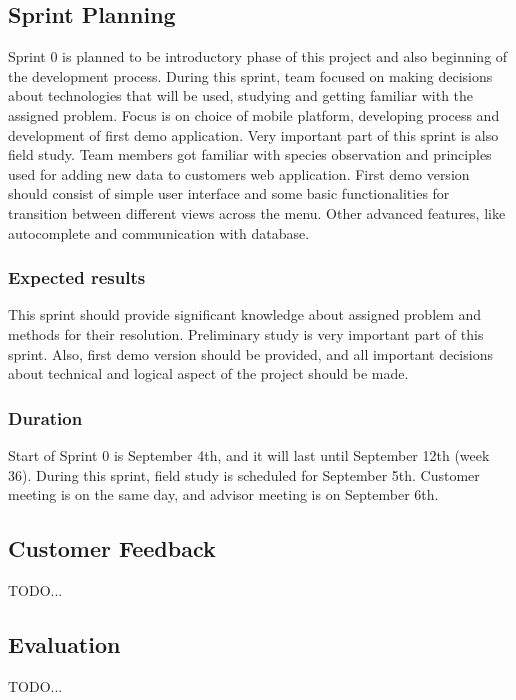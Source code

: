 \subsection{Sprint Planning}
	Sprint 0 is planned to be introductory phase of this project and also beginning of the development process. During this sprint, team focused on making decisions about technologies that will be used, studying and getting familiar with the assigned problem. Focus is on choice of mobile platform, developing process and development of first demo application. Very important part of this sprint is also field study. Team members got familiar with species observation and principles used for adding new data to customers web application. First demo version should consist of simple user interface and some basic functionalities for transition between different views across the menu. Other advanced features, like autocomplete and communication with database.
	
	\subsubsection{Expected results}
	This sprint should provide significant knowledge about assigned problem and methods for their resolution. Preliminary study is very important part of this sprint. Also, first demo version should be provided, and all important decisions about technical and logical aspect of the project should be made.
	
	\subsubsection{Duration}
	Start of Sprint 0 is September 4th, and it will last until September 12th (week 36). During this sprint, field study is scheduled for September 5th. Customer meeting is on the same day, and advisor meeting is on September 6th.
	
	
	
\subsection{Customer Feedback}
	TODO...
	
\subsection{Evaluation}
	TODO...
